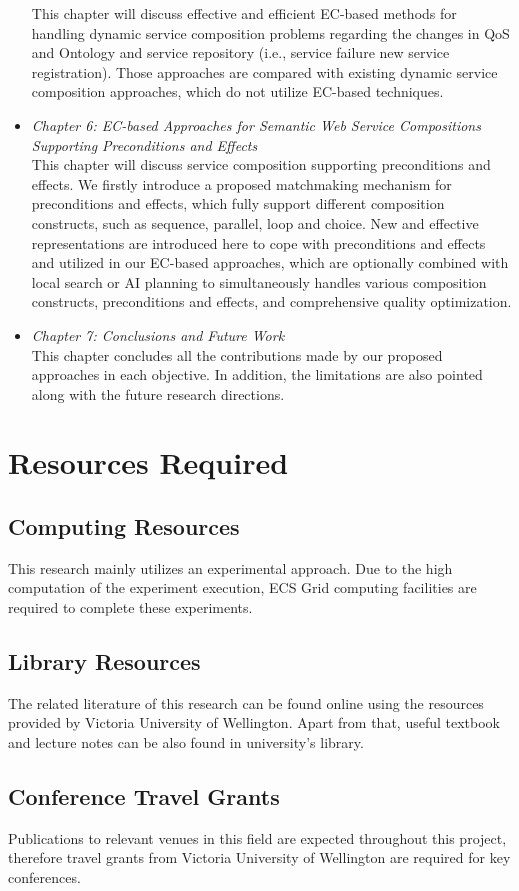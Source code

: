 \begin{itemize}
This chapter will discuss effective and efficient EC-based methods for handling dynamic service composition problems regarding the changes in QoS and Ontology and service repository (i.e., service failure new service registration). Those approaches are compared with existing dynamic service composition approaches, which do not utilize EC-based techniques.
 \item \textit{Chapter 6: EC-based Approaches for Semantic Web Service Compositions Supporting Preconditions and Effects}\\
This chapter will discuss service composition supporting preconditions and effects. We firstly introduce a proposed matchmaking mechanism for preconditions and effects, which fully support different composition constructs, such as sequence, parallel, loop and choice. New and effective representations are introduced here to cope with preconditions and effects and utilized in our EC-based approaches, which are optionally combined with local search or AI planning to simultaneously handles various composition constructs, preconditions and effects, and comprehensive quality optimization. 
\item \textit{Chapter 7: Conclusions and Future Work}\\
This chapter concludes all the contributions made by our proposed approaches in each objective. In addition, the limitations are also pointed along with the future research directions.
\end{itemize}


\section{Resources Required}

\subsection{Computing Resources}
This research mainly utilizes an experimental approach. Due to the high computation of the experiment execution, ECS Grid computing facilities are required to complete these experiments.

\subsection{Library Resources}
The related literature of this research can be found online using the resources provided by Victoria University of Wellington. Apart from that, useful textbook and lecture notes can be also found in university's library.

\subsection{Conference Travel Grants}
Publications to relevant venues in this field are expected throughout this project, therefore travel grants from Victoria University of Wellington are required for key conferences.